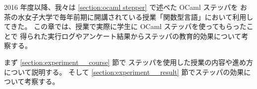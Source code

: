 
2016 年度以降、我々は \ref{section:ocaml stepper} で述べた OCaml ステッパを
お茶の水女子大学で毎年前期に開講されている授業「関数型言語」において利用してきた。
この章では、授業で実際に学生に OCaml ステッパを使ってもらったことで
得られた実行ログやアンケート結果からステッパの教育的効果について考察する。

まず \ref{section:experiment__course} 節で
ステッパを使用した授業の内容や進め方について説明する。
そして \ref{section:experiment__result} 節でステッパの効果について考察する。
